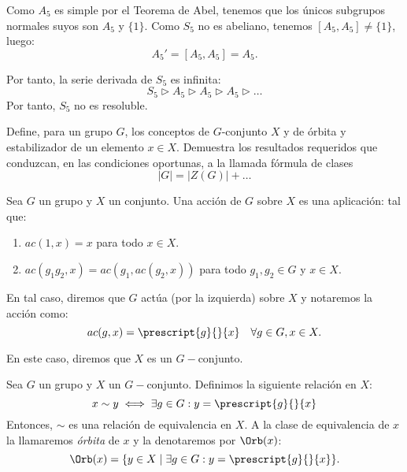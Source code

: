 \begin{ejercicio}
\begin{itemize}
        Como $A_5$ es simple por el Teorema de Abel, tenemos que los únicos subgrupos normales suyos son \(A_5\) y \(\{1\}\). Como \(S_5\) no es abeliano, tenemos \([A_5, A_5]\neq \{1\}\), luego:
        \begin{equation*}
            A_5' = [A_5, A_5] = A_5.
        \end{equation*}

        Por tanto, la serie derivada de \(S_5\) es infinita:
        \begin{equation*}
            S_5 \rhd A_5 \rhd A_5 \rhd A_5 \rhd \ldots
        \end{equation*}
        Por tanto, \(S_5\) no es resoluble.
    \end{itemize}
\end{ejercicio}

\newpage
\begin{ejercicio}
    Define, para un grupo \(G\), los conceptos de \(G\)-conjunto \(X\) y de órbita y estabilizador de un elemento \(x \in X\). Demuestra los resultados requeridos que conduzcan, en las condiciones oportunas, a la llamada fórmula de clases \[|G| = |Z(G)| + \ldots\]

    \begin{definicion}[Acción]
        Sea \(G\) un grupo y \(X\) un conjunto. Una acción de \(G\) sobre \(X\) es una aplicación:
        tal que:
        \begin{enumerate}
            \item \(ac(1, x) = x\) para todo \(x\in X\).
            \item \(ac(g_1g_2, x) = ac(g_1, ac(g_2, x))\) para todo \(g_1, g_2\in G\) y \(x\in X\).
        \end{enumerate}
        En tal caso, diremos que \(G\) actúa (por la izquierda) sobre \(X\) y notaremos la acción como:
        \begin{equation*}
            ac(g,x)=\prescript{g}{ }{x} \quad \forall g\in G, x\in X.
        \end{equation*}

        En este caso, diremos que \(X\) es un \(G-\)conjunto.
    \end{definicion}

    \begin{prop}[Órbita]
        Sea $G$ un grupo y \(X\) un \(G-\)conjunto. Definimos la siguiente relación en \(X\):
        \begin{equation*}
            x \sim y \iff \exists g\in G: y = \prescript{g}{}{x}
        \end{equation*}
        Entonces, \(\sim\) es una relación de equivalencia en \(X\). A la clase de equivalencia de \(x\) la llamaremos \emph{órbita} de \(x\) y la denotaremos por $\Orb(x)$:
        \begin{equation*}
            \Orb(x) = \{y\in X \mid \exists g\in G: y = \prescript{g}{}{x}\}.
        \end{equation*}
    \end{prop}


\end{ejercicio}
